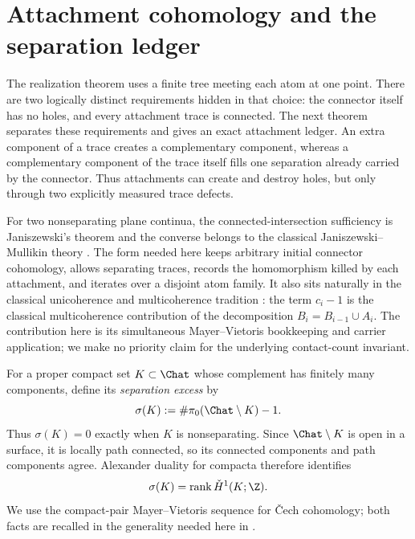 \section{Attachment cohomology and the separation ledger}
\label{sec:separation-budget}

The realization theorem uses a finite tree meeting each atom at one point.
There are two logically distinct requirements hidden in that choice: the
connector itself has no holes, and every attachment trace is connected.  The
next theorem separates these requirements and gives an exact attachment
ledger.  An extra component of a trace creates a complementary component,
whereas a complementary component of the trace itself fills one separation
already carried by the connector.  Thus attachments can create and destroy
holes, but only through two explicitly measured trace defects.

For two nonseparating plane continua, the connected-intersection
sufficiency is Janiszewski's theorem and the converse belongs to the
classical Janiszewski--Mullikin theory \cite{Jan15,Mul22,New51,Why42}.  The
form needed here keeps arbitrary initial connector cohomology, allows
separating traces, records the homomorphism killed by each attachment, and
iterates over a disjoint atom family.  It also sits naturally in the
classical unicoherence and multicoherence tradition \cite{Bor31,Eil36}:
the term $c_i-1$ is the classical multicoherence contribution of the
decomposition $B_i=B_{i-1}\cup A_i$.  The contribution here is its
simultaneous Mayer--Vietoris bookkeeping and carrier application; we make
no priority claim for the underlying contact-count invariant.

For a proper compact set $K\subset\Chat$ whose complement has finitely many
components, define its \emph{separation excess} by
\begin{equation}
 \sigma(K):=\#\pi_0(\Chat\setminus K)-1.
 \label{eq:G-separation-excess}
\end{equation}
Thus $\sigma(K)=0$ exactly when $K$ is nonseparating.  Since
$\Chat\setminus K$ is open in a surface, it is locally path connected, so its
connected components and path components agree.  Alexander duality for
compacta therefore identifies
\begin{equation}
 \sigma(K)=\operatorname{rank}\check H^1(K;\Z).
 \label{eq:G-dual-rank}
\end{equation}
We use the compact-pair Mayer--Vietoris sequence for \v{C}ech cohomology; both
facts are recalled in the generality needed here in \cite[Chapter~6]{Spa66}.

